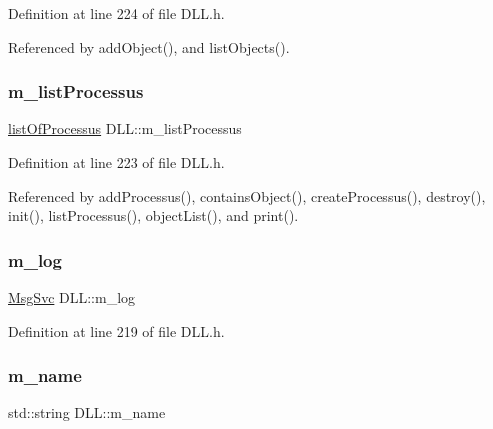 Definition at line 224 of file D\+L\+L.\+h.



Referenced by add\+Object(), and list\+Objects().

\mbox{\label{classDLL_a197e92b990184a27a74f4a0456897bd5}} 
\subsubsection{\texorpdfstring{m\+\_\+list\+Processus}{m\_listProcessus}}
{\footnotesize\ttfamily \hyperlink{classDLL_aded1b0bb41b288ed4f34cb6d6632d486}{list\+Of\+Processus} D\+L\+L\+::m\+\_\+list\+Processus\hspace{0.3cm}{\ttfamily [private]}}



Definition at line 223 of file D\+L\+L.\+h.



Referenced by add\+Processus(), contains\+Object(), create\+Processus(), destroy(), init(), list\+Processus(), object\+List(), and print().

\mbox{\label{classDLL_a6e66cd993e2d142b48691557ce8e4047}} 
\subsubsection{\texorpdfstring{m\+\_\+log}{m\_log}}
{\footnotesize\ttfamily \hyperlink{classMsgSvc}{Msg\+Svc} D\+L\+L\+::m\+\_\+log\hspace{0.3cm}{\ttfamily [private]}}



Definition at line 219 of file D\+L\+L.\+h.

\mbox{\label{classDLL_ad5e4d36d8c2575447f73acc2a703b405}} 
\subsubsection{\texorpdfstring{m\+\_\+name}{m\_name}}
{\footnotesize\ttfamily std\+::string D\+L\+L\+::m\+\_\+name\hspace{0.3cm}{\ttfamily [private]}}



